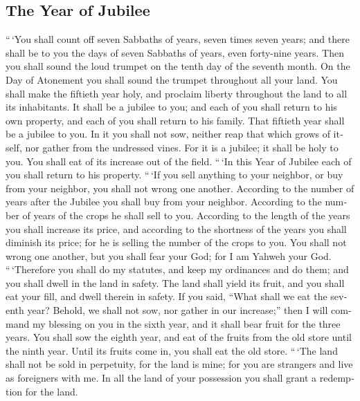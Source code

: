 \begin{paracol}{2}
\begin{otherlanguage}{english}
\hypertarget{the-year-of-jubilee}{%
\subsection{The Year of Jubilee}\label{the-year-of-jubilee}}

 ``\,`You shall count off seven Sabbaths of years, seven
times seven years; and there shall be to you the days of seven Sabbaths
of years, even forty-nine years.  Then you shall sound the
loud trumpet on the tenth day of the seventh month. On the Day of
Atonement you shall sound the trumpet throughout all your land.
 You shall make the fiftieth year holy, and proclaim
liberty throughout the land to all its inhabitants. It shall be a
jubilee to you; and each of you shall return to his own property, and
each of you shall return to his family.  That fiftieth
year shall be a jubilee to you. In it you shall not sow, neither reap
that which grows of itself, nor gather from the undressed vines.
 For it is a jubilee; it shall be holy to you. You shall
eat of its increase out of the field.  ``\,`In this Year
of Jubilee each of you shall return to his property. 
``\,`If you sell anything to your neighbor, or buy from your neighbor,
you shall not wrong one another.  According to the number
of years after the Jubilee you shall buy from your neighbor. According
to the number of years of the crops he shall sell to you.
 According to the length of the years you shall increase
its price, and according to the shortness of the years you shall
diminish its price; for he is selling the number of the crops to you.
 You shall not wrong one another, but you shall fear your
God; for I am Yahweh your God.  ``\,`Therefore you shall
do my statutes, and keep my ordinances and do them; and you shall dwell
in the land in safety.  The land shall yield its fruit,
and you shall eat your fill, and dwell therein in safety.
 If you said, ``What shall we eat the seventh year?
Behold, we shall not sow, nor gather in our increase;'' 
then I will command my blessing on you in the sixth year, and it shall
bear fruit for the three years.  You shall sow the eighth
year, and eat of the fruits from the old store until the ninth year.
Until its fruits come in, you shall eat the old store. 
``\,`The land shall not be sold in perpetuity, for the land is mine; for
you are strangers and live as foreigners with me.  In all
the land of your possession you shall grant a redemption for the land.


\end{otherlanguage}
\end{paracol}
